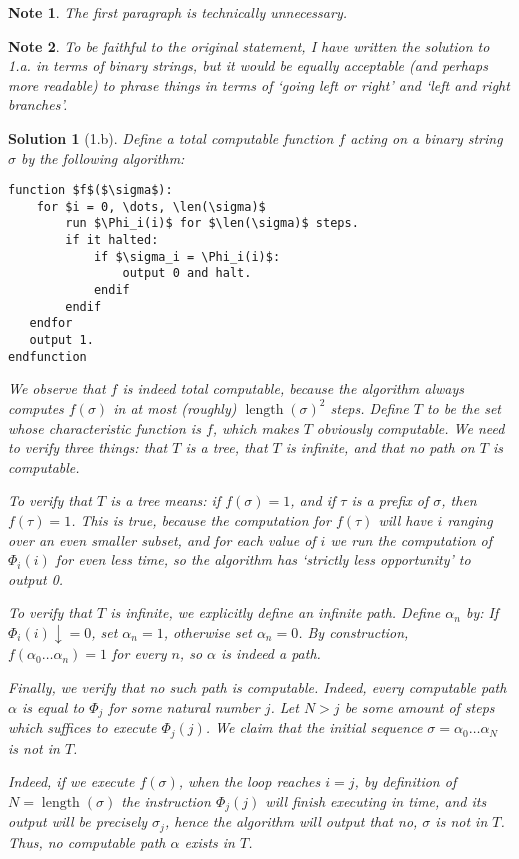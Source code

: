 \documentclass{article}
\theoremstyle{nonumberplain}
\newtheorem{sol}{Solution}
\newtheorem{note}{Note}
\DeclareMathOperator{\len}{length}
\begin{document}
\begin{note}
The first paragraph is technically unnecessary.
\end{note}

\begin{note}
To be faithful to the original statement, I have written the solution to 1.a. in terms of binary strings, but it would be equally acceptable (and perhaps more readable) to phrase things in terms of `going left or right' and `left and right branches'.
\end{note}

\begin{sol}[1.b]
Define a total computable function $f$ acting on a binary string $\sigma$ by the following algorithm:

\begin{lstlisting}
function $f$($\sigma$):
    for $i = 0, \dots, \len(\sigma)$
        run $\Phi_i(i)$ for $\len(\sigma)$ steps.
        if it halted:
            if $\sigma_i = \Phi_i(i)$:
                output 0 and halt.
            endif
        endif
   endfor
   output 1.
endfunction
\end{lstlisting}

We observe that $f$ is indeed total computable, because the algorithm always computes $f(\sigma)$ in at most (roughly) $\len(\sigma)^2$ steps. Define $T$ to be the set whose characteristic function is $f$, which makes $T$ obviously computable. We need to verify three things: that $T$ is a tree, that $T$ is infinite, and that no path on $T$ is computable.

To verify that $T$ is a tree means: if $f(\sigma) = 1$, and if $\tau$ is a prefix of $\sigma$, then $f(\tau) = 1$. This is true, because the computation for $f(\tau)$ will have $i$ ranging over an even smaller subset, and for each value of $i$ we run the computation of $\Phi_i(i)$ for even less time, so the algorithm has `strictly less opportunity' to output 0.

To verify that $T$ is infinite, we explicitly define an infinite path. Define $\alpha_n$ by: If $\Phi_i(i)\downarrow = 0$, set $\alpha_n = 1$, otherwise set $\alpha_n = 0$. By construction, $f(\alpha_0 \dots \alpha_n) = 1$ for every $n$, so $\alpha$ is indeed a path.

Finally, we verify that no such path is computable. Indeed, every computable path $\alpha$ is equal to $\Phi_j$ for some natural number $j$. Let $N > j$ be some amount of steps which suffices to execute $\Phi_j(j)$. We claim that the initial sequence $\sigma = \alpha_0 \dots \alpha_N$ is not in $T$.

Indeed, if we execute $f(\sigma)$, when the loop reaches $i = j$, by definition of $N = \len(\sigma)$ the instruction $\Phi_j(j)$ will finish executing in time, and its output will be precisely $\sigma_j$, hence the algorithm will output that no, $\sigma$ is not in $T$. Thus, no computable path $\alpha$ exists in $T$.
\end{sol}
\end{document}
